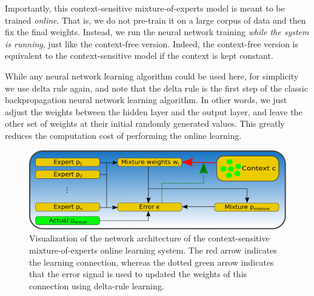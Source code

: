 Importantly, this context-sensitive mixture-of-experts model is meant to be trained \textit{online}.
That is, we do not pre-train it on a large corpus of data and then fix the final weights.  Instead, we run the neural network training \textit{while the system is running}, just like the context-free version.
Indeed, the context-free version is equivalent to the context-sensitive model if the context is kept constant.

While any neural network learning algorithm could be used here, for simplicity we use delta rule again, and note that the delta rule is the first step of the classic backpropagation neural network learning algorithm.
In other words, we just adjust the weights between the hidden layer and the output layer, and leave the other set of weights at their initial randomly generated values.
This greatly reduces the computation cost of performing the online learning.
\begin{figure}[t!]
    \centering
    \includegraphics[width=\textwidth]{imgs/mix_of_experts.eps}
    \caption{Visualization of the network architecture of the context-sensitive mixture-of-experts online learning system. The red arrow indicates the learning connection, whereas the dotted green arrow indicates that the error signal is used to updated the weights of this connection using delta-rule learning.}\label{fig:data_example}
\end{figure}

